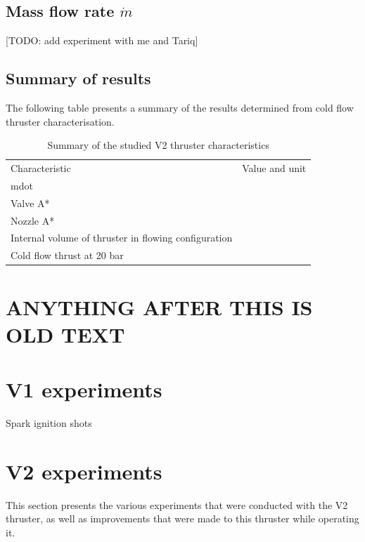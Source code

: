         \subsection{Mass flow rate $\dot m$}

            [TODO: add experiment with me and Tariq]

        \subsection{Summary of results}

            The following table presents a summary of the results determined from cold flow thruster characterisation.

            \begin{table}[!ht]
                \caption{Summary of the studied V2 thruster characteristics}
                \label{tab:characteristics}
                \begin{tabularx}{\textwidth}{XX}
                Characteristic             & Value and unit \\
                mdot                       &                \\
                Valve A*                   &                \\
                Nozzle A*                  &                \\
                Internal volume of thruster in flowing configuration        &                \\
                Cold flow thrust at 20 bar &               
                \end{tabularx}
            \end{table}

    \section{ANYTHING AFTER THIS IS OLD TEXT}

    \section{V1 experiments}
        
        Spark ignition shots

    \section{V2 experiments}
        This section presents the various experiments that were conducted with the V2 thruster, as well as improvements that were made to this thruster while operating it.
    
